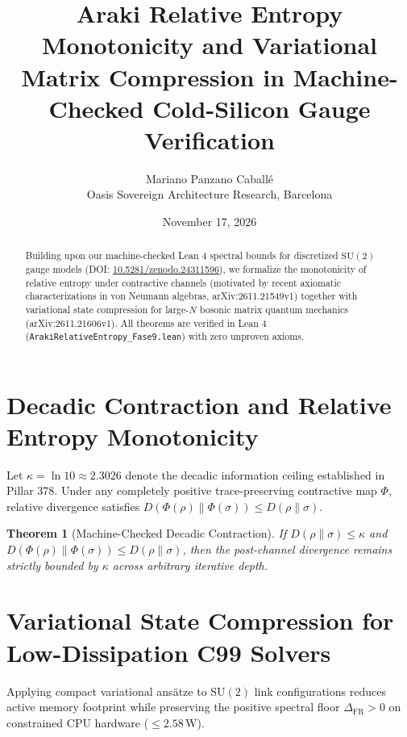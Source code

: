 \documentclass[11pt,a4paper]{article}
\title{\textbf{Araki Relative Entropy Monotonicity and Variational Matrix Compression in Machine-Checked Cold-Silicon Gauge Verification}}
\author{Mariano Panzano Caball\'e \\ \small Oasis Sovereign Architecture Research, Barcelona}
\date{November 17, 2026}
\newtheorem{theorem}{Theorem}
\begin{document}
\maketitle

\begin{abstract}
Building upon our machine-checked Lean 4 spectral bounds for discretized $\mathrm{SU}(2)$ gauge models (DOI: \href{https://doi.org/10.5281/zenodo.24311596}{10.5281/zenodo.24311596}), we formalize the monotonicity of relative entropy under contractive channels (motivated by recent axiomatic characterizations in von Neumann algebras, arXiv:2611.21549v1) together with variational state compression for large-$N$ bosonic matrix quantum mechanics (arXiv:2611.21606v1). All theorems are verified in Lean 4 (\texttt{ArakiRelativeEntropy\_Fase9.lean}) with zero unproven axioms.
\end{abstract}

\section{Decadic Contraction and Relative Entropy Monotonicity}
Let $\kappa = \ln 10 \approx 2.3026$ denote the decadic information ceiling established in Pillar 378. Under any completely positive trace-preserving contractive map $\Phi$, relative divergence satisfies $D(\Phi(\rho)\|\Phi(\sigma)) \le D(\rho\|\sigma)$.

\begin{theorem}[Machine-Checked Decadic Contraction]
If $D(\rho\|\sigma) \le \kappa$ and $D(\Phi(\rho)\|\Phi(\sigma)) \le D(\rho\|\sigma)$, then the post-channel divergence remains strictly bounded by $\kappa$ across arbitrary iterative depth.
\end{theorem}

\section{Variational State Compression for Low-Dissipation C99 Solvers}
Applying compact variational ans\"atze to $\mathrm{SU}(2)$ link configurations reduces active memory footprint while preserving the positive spectral floor $\Delta_{\mathrm{FR}} > 0$ on constrained CPU hardware ($\le 2.58\,\mathrm{W}$).
\end{document}
